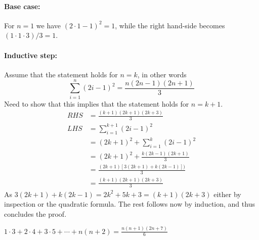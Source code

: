 \documentclass[a4paper, english, 12pt]{article} %
\begin{document}
\begin{answer}
  \paragraph{Base case:} For $n=1$ we have $(2\cdot 1-1)^2 = 1$, while the right
  hand-side becomes $(1 \cdot 1 \cdot 3)/3 = 1$.

  \paragraph{Inductive step:} Assume that the statement holds for $n=k$, in
  other words
  \begin{equation*}
    \sum_{i=1}^n (2i-1)^2 = \frac{n(2n-1)(2n+1)}{3}
  \end{equation*}
  Need to show that this implies that the statement holds for $n=k+1$.
  \begin{align*}
    RHS & = \frac{(k+1)(2k+1)(2k+3)}{3} \\
    LHS & = \sum_{i=1}^{k+1} (2i-1)^2 \\
        & = (2k+1)^2 + \sum_{i=1}^k (2i-1)^2 \\
        & = (2k+1)^2 + \frac{k(2k-1)(2k+1)}{3} \\
        & = \frac{(2k+1)[3(2k+1) + k(2k-1)])}{3} \\
        & = \frac{(k+1)(2k+1)(2k+3)}{3} 
  \end{align*}
  As $3(2k+1) + k(2k-1) = 2k^2 + 5k + 3 = (k+1)(2k+3)$ either by inspection or
  the quadratic formula. The rest follows now by induction, and thus concludes
  the proof.
\end{answer}

\begin{subproblem}
  $\displaystyle 1 \cdot 3 + 2 \cdot 4 + 3 \cdot 5 + \cdots + n(n+2) = \frac{n(n+1)(2n+7)}{6}$
\end{subproblem}
\end{document}
